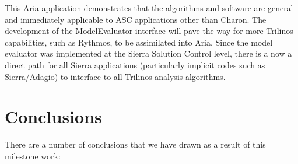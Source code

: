 \documentclass[pdf,ps2pdf,11pt]{SANDreport}
\begin{document}
This Aria application demonstrates that the algorithms and software are
general and immediately applicable to ASC applications other than Charon. The
development of the ModelEvaluator interface will pave the way for more
Trilinos capabilities, such as Rythmos, to be assimilated into Aria. Since the
model evaluator was implemented at the Sierra Solution Control level, there is
a now a direct path for all Sierra applications (particularly implicit codes
such as Sierra/Adagio) to interface to all Trilinos analysis algorithms.


%
\section{Conclusions}
%

There are a number of conclusions that we have drawn as a result of this
milestone work:
\end{document}
